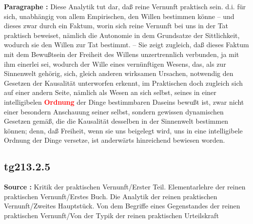 \documentclass[a4paper,12pt,twoside]{book}
\newcommand{\match}[1]{\textcolor{red}{\textbf{#1}}}
\begin{document}
	\noindent\textbf{Paragraphe : }Diese Analytik tut dar, daß reine Vernunft praktisch sein. d.i. für sich, unabhängig von allem Empirischen, den Willen bestimmen könne – und dieses zwar durch ein Faktum, worin sich reine Vernunft bei uns in der Tat praktisch beweiset, nämlich die Autonomie in dem Grundsatze der Sittlichkeit, wodurch sie den Willen zur Tat bestimmt. – Sie zeigt zugleich, daß dieses Faktum mit dem Bewußtsein der Freiheit des Willens unzertrennlich verbunden, ja mit ihm einerlei sei, wodurch der Wille eines vernünftigen Wesens, das, als zur Sinnenwelt gehörig, sich, gleich anderen wirksamen Ursachen, notwendig den Gesetzen der Kausalität unterworfen erkennt, im Praktischen doch zugleich sich auf einer andern Seite, nämlich als Wesen an sich selbst, seines in einer intelligibelen \match{Ordnung} der Dinge bestimmbaren Daseins bewußt ist, zwar nicht einer besondern Anschauung seiner selbst, sondern gewissen dynamischen Gesetzen gemäß, die die Kausalität desselben in der Sinnenwelt bestimmen können; denn, daß Freiheit, wenn sie uns beigelegt wird, uns in eine intelligibele Ordnung der Dinge versetze, ist anderwärts hinreichend bewiesen worden. 
	
	\subsection*{tg213.2.5} 
	\textbf{Source : }Kritik der praktischen Vernunft/Erster Teil. Elementarlehre der reinen praktischen Vernunft/Erstes Buch. Die Analytik der reinen praktischen Vernunft/Zweites Hauptstück. Von dem Begriffe eines Gegenstandes der reinen praktischen Vernunft/Von der Typik der reinen praktischen Urteilskraft\\  
	
\end{document}
